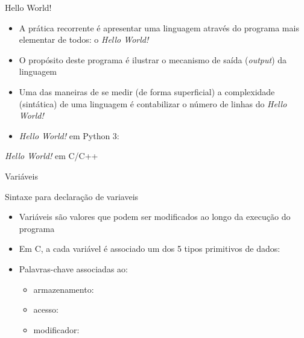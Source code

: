 \begin{frame}[fragile]{Hello World!}

	\begin{itemize}

		\item A prática recorrente é apresentar uma linguagem através do programa
		mais elementar de todos: o \textit{Hello World!}

		\item O propósito deste programa é ilustrar o mecanismo de saída (\textit{output}) da 
        linguagem

		\item Uma das maneiras de se medir (de forma superficial) a complexidade (sintática) de uma 
        linguagem é contabilizar o número de linhas do \textit{Hello World!}

        \item \textit{Hello World!} em Python 3:


	\end{itemize}
	
\end{frame}

\begin{frame}[fragile]{\textit{Hello World!} em C/C++}


\end{frame}

\begin{frame}[fragile]{Variáveis}
	
    \begin{block}{Sintaxe para declaração de variaveis}
    \end{block}
	\begin{itemize}
        \item Variáveis são valores que podem ser modificados ao longo da execução do programa
        \item Em C, a cada variável é associado um dos 5 tipos primitivos de dados:

		\item Palavras-chave associadas ao:
		\begin{itemize}
			\item armazenamento: 
			\item acesso:  
			\item modificador:  
		\end{itemize}
		
	\end{itemize}
	
\end{frame}

